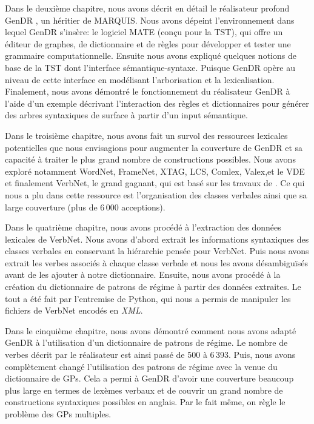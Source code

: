 Dans le deuxième chapitre, nous avons décrit en détail le réalisateur profond GenDR \citep{lareau18}, un héritier de MARQUIS. Nous avons dépeint l'environnement dans lequel GenDR s'insère: le logiciel MATE (conçu pour la TST), qui offre un éditeur de graphes, de dictionnaire et de règles pour développer et tester une grammaire computationnelle. Ensuite nous avons expliqué quelques notions de base de la \ac{TST} dont l'interface sémantique-syntaxe. Puisque GenDR opère au niveau de cette interface en modélisant l'arborisation et la lexicalisation. Finalement, nous avons démontré le fonctionnement du réalisateur GenDR à l'aide d'un exemple décrivant l'interaction des règles et dictionnaires pour générer des arbres syntaxiques de surface à partir d'un input sémantique.

Dans le troisième chapitre, nous avons fait un survol des ressources lexicales potentielles que nous envisagions pour augmenter la couverture de GenDR et sa capacité à traiter le plus grand nombre de constructions possibles. Nous avons exploré notamment WordNet, FrameNet, XTAG, LCS, Comlex, Valex,et le VDE et finalement VerbNet, le grand gagnant, qui est basé sur les travaux de \cite{verb-classes.levin.1993}. Ce qui nous a plu dans cette ressource est l'organisation des classes verbales ainsi que sa large couverture (plus de 6\,000 acceptions).

Dans le quatrième chapitre, nous avons procédé à l'extraction des données lexicales de VerbNet. Nous avons d'abord extrait les informations syntaxiques des classes verbales en conservant la hiérarchie pensée pour VerbNet. Puis nous avons extrait les verbes associés à chaque classe verbale et nous les avons désambiguïsés avant de les ajouter à notre dictionnaire. Ensuite, nous avons procédé à la création du dictionnaire de patrons de régime à partir des données extraites. Le tout a été fait par l'entremise de Python, qui nous a permis de manipuler les fichiers de VerbNet encodés en \emph{XML}.

Dans le cinquième chapitre, nous avons démontré comment nous avons adapté GenDR à l'utilisation d'un dictionnaire de patrons de régime. Le nombre de verbes décrit par le réalisateur est ainsi passé de 500 à 6\,393. Puis, nous avons complètement changé l'utilisation des patrons de régime avec la venue du dictionnaire de \acp{GP}. Cela a permi à GenDR d'avoir une couverture beaucoup plus large en termes de lexèmes verbaux et de couvrir un grand nombre de constructions syntaxiques possibles en anglais. Par le fait même, on règle le problème des \acp{GP} multiples.
	
